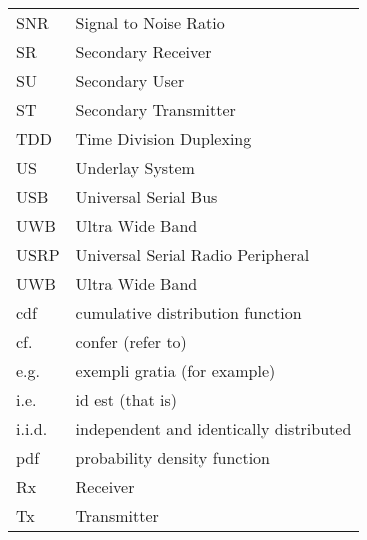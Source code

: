 \begin{longtable}{p{}p{}}
	SNR	&	Signal to Noise Ratio \\
	SR	& 	Secondary Receiver \\
	SU	&	Secondary User \\
	ST	& 	Secondary Transmitter \\
	TDD	& 	Time Division Duplexing \\
	US	&	Underlay System \\
	USB	&	Universal Serial Bus \\
	UWB 	&	Ultra Wide Band \\
	USRP	&	Universal Serial Radio Peripheral\\
	UWB 	&	Ultra Wide Band \\

	cdf	&       cumulative distribution function \\
	cf.	&	confer (refer to) \\ 
 	e.g.	& 	exempli gratia (for example) \\
 	i.e.	& 	id est (that is) \\ 
 	i.i.d.	& 	independent and identically distributed \\ 
	pdf	&       probability density function \\
 	Rx	& 	Receiver \\
 	Tx	& 	Transmitter

\end{longtable}
  






